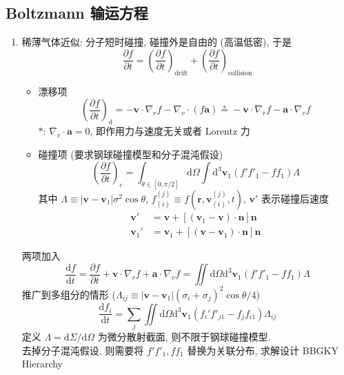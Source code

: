 \documentclass[12pt,a4paper]{article}%
\numberwithin{equation}{section}
\renewcommand*{\vec}[1]{\bm{#1}}%
\newcommand{\dif}{\mathrm{d}}
\begin{document}
\subsection{Boltzmann 输运方程} %
\label{sub:boltzmann_equ}
\begin{enumerate}
    \item 稀薄气体近似: 分子短时碰撞, 碰撞外是自由的 (高温低密), 于是
    \begin{equation}
        \frac{\partial f}{\partial t} = \left(\frac{\partial f}{\partial t} \right)_{\mathrm{drift}} + \left(\frac{\partial f}{\partial t} \right)_{\mathrm{collision}}
    \end{equation}
    \begin{itemize}
        \item 漂移项
        \begin{equation}
            \left(\frac{\partial f}{\partial t} \right)_{\mathrm d} = -\vec v\cdot\nabla_r f - \nabla_v \cdot(f\vec a) \stackrel*= -\vec v\cdot\nabla_r f - \vec a\cdot\nabla_v f
        \end{equation}
        $*$: $\nabla_v\cdot \vec a = 0$, 即作用力与速度无关或者 Lorentz 力
        \item 碰撞项 (要求钢球碰撞模型和分子混沌假设)
        \begin{equation}
            \left(\frac{\partial f}{\partial t} \right)_{\mathrm c} = \int_{\theta\in[0,\pi/2]}\dif\Omega\int\dif^3\vec v_1(f'f'_1 - ff_1)\Lambda
        \end{equation}
        其中 $\Lambda \equiv |\vec v - \vec v_1|\sigma^2\cos\theta$, $f_{(i)}^{(j)} \equiv  f(\vec r,\vec v_{(i)}^{(j)}, t)$, $\vec v'$ 表示碰撞后速度
        \begin{align*}
            \vec v' &= \vec v + [(\vec v_1 -\vec v)\cdot\vec n]\vec n \\
            \vec v_1' &= \vec v_1 + [(\vec v -\vec v_1)\cdot\vec n]\vec n
        \end{align*}
    \end{itemize}
    两项加入
    \begin{equation}
        \frac{\dif f}{\dif t} = \frac{\partial f}{\partial t} + \vec v\cdot\nabla_r f + \vec a\cdot\nabla_v f = \iint\dif\Omega\dif^3\vec v_1(f'f'_1 - ff_1)\Lambda
    \end{equation}
    推广到多组分的情形 ($\Lambda_{ij} \equiv |\vec v - \vec v_1|(\sigma_i + \sigma_j)^2\cos\theta /4 $)
    \begin{equation}
        \frac{\dif f_i}{\dif t} = \sum_j\iint\dif\Omega\dif^3\vec v_1(f_i'f'_{j1} - f_jf_{i1})\Lambda_{ij}
    \end{equation}
    定义 $\Lambda = \dif\Sigma/\dif\Omega$ 为微分散射截面, 则不限于钢球碰撞模型. \\
    去掉分子混沌假设, 则需要将 $f'f'_1 , ff_1$ 替换为关联分布, 求解设计 BBGKY Hierarchy
\end{enumerate}
\end{document}
